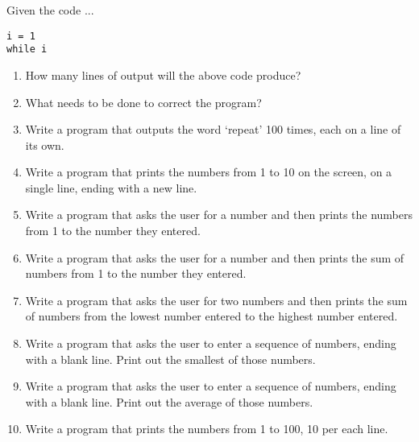 Given the code ...
\begin{lstlisting}
i = 1
while i 
\end{lstlisting}
\begin{enumerate}
	\item How many lines of output will the above code produce?
	\item What needs to be done to correct the program?
	\item Write a program that outputs the word `repeat' 100 times,
			each on a line of its own.
	\item Write a program that prints the numbers from 1 to 10 on the
			screen, on a single line, ending with a new line.
	\item Write a program that asks the user for a number and then
			prints the numbers from 1 to the number they entered.
	\item Write a program that asks the user for a number and then
			prints the sum of numbers from 1 to the number they
			entered.
	\item Write a program that asks the user for two numbers and then
			prints the sum of numbers from the lowest number entered to the
			highest number entered.
	\item Write a program that asks the user to enter a sequence of
			numbers, ending with a blank line. Print out the smallest of those
			numbers.
	\item Write a program that asks the user to enter a sequence of
			numbers, ending with a blank line. Print out the average of those
			numbers.
	\item Write a program that prints the numbers from 1 to 100, 10
			per each line.
\end{enumerate}
